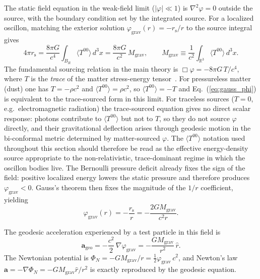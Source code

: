 \documentclass[aps,prd,onecolumn,superscriptaddress,nofootinbib,showpacs,12pt,notitlepage]{revtex4-2}
\newcommand{\rs}{r_{\mathrm{s}}}
\begin{document}
The static field equation in the weak-field limit
($|\varphi| \ll 1$) is $\nabla^2\varphi = 0$
outside the source, with the boundary condition set by
the integrated source.  For a localized oscillon, matching the
exterior solution $\varphi_{\mathrm{grav}}(r) = -\rs/r$ to the
source integral gives
\begin{equation}\label{eq:gauss_phi}
  4\pi\rs
  = \frac{8\pi G}{c^4}\int_{B_R}\!\langle T^{00}\rangle\,d^3x
  = \frac{8\pi G}{c^2}\,M_{\mathrm{grav}},
  \qquad
  M_{\mathrm{grav}} \equiv \frac{1}{c^2}
  \int_{\mathbb{R}^3}\!\langle T^{00}\rangle\,d^3x .
\end{equation}
The fundamental sourcing relation in the main theory is
$\Box\varphi = -8\pi G\,T/c^{4}$, where $T$ is the \emph{trace}
of the matter stress-energy tensor~\cite{Lotishvili2026}.  For
pressureless matter (dust) one has $T = -\rho c^{2}$ and
$\langle T^{00}\rangle = \rho c^{2}$, so $\langle T^{00}\rangle =
-T$ and Eq.~(\ref{eq:gauss_phi}) is equivalent to the
trace-sourced form in this limit.  For traceless sources
($T = 0$, e.g.~electromagnetic radiation) the trace-sourced
equation gives no direct scalar response: photons contribute to
$\langle T^{00}\rangle$ but not to $T$, so they do not source
$\varphi$ directly, and their gravitational deflection arises
through geodesic motion in the bi-conformal metric determined by
matter-sourced $\varphi$.  The $\langle T^{00}\rangle$
notation used throughout this section should therefore be read
as the effective energy-density source appropriate to the
non-relativistic, trace-dominant regime in which the oscillon
bodies live.
The Bernoulli pressure deficit already fixes the sign of the
field: positive localized energy lowers the static pressure and
therefore produces $\varphi_{\mathrm{grav}} < 0$.  Gauss's
theorem then fixes the magnitude of the $1/r$ coefficient,
yielding
\begin{equation}
  \varphi_{\mathrm{grav}}(r)
  = -\frac{\rs}{r}
  = -\frac{2GM_{\mathrm{grav}}}{c^2 r}.
\end{equation}

The geodesic acceleration experienced by a test
particle in this field is~\cite{Lotishvili2026}
\begin{equation}\label{eq:grav_accel}
  \mathbf{a}_{\mathrm{geo}}
  = -\frac{c^2}{2}\,\nabla\varphi_{\mathrm{grav}}
  = -\frac{GM_{\mathrm{grav}}}{r^{2}}\,\hat{r}.
\end{equation}
The Newtonian potential is
$\Phi_N = -GM_{\mathrm{grav}}/r
= \frac{1}{2}\varphi_{\mathrm{grav}}\,c^2$, and
Newton's law $\mathbf{a} = -\nabla\Phi_N
= -GM_{\mathrm{grav}}\hat{r}/r^2$
is exactly reproduced by the geodesic equation.
\end{document}
